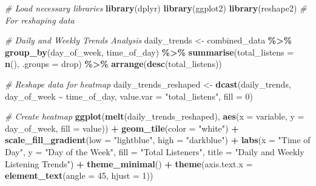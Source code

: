 \documentclass[
]{article}
\newenvironment{Shaded}{\begin{snugshade}}{\end{snugshade}}
\newcommand{\AttributeTok}[1]{\textcolor[rgb]{0.13,0.29,0.53}{#1}}
\newcommand{\CommentTok}[1]{\textcolor[rgb]{0.56,0.35,0.01}{\textit{#1}}}
\newcommand{\DecValTok}[1]{\textcolor[rgb]{0.00,0.00,0.81}{#1}}
\newcommand{\FunctionTok}[1]{\textcolor[rgb]{0.13,0.29,0.53}{\textbf{#1}}}
\newcommand{\NormalTok}[1]{#1}
\newcommand{\OtherTok}[1]{\textcolor[rgb]{0.56,0.35,0.01}{#1}}
\newcommand{\SpecialCharTok}[1]{\textcolor[rgb]{0.81,0.36,0.00}{\textbf{#1}}}
\newcommand{\StringTok}[1]{\textcolor[rgb]{0.31,0.60,0.02}{#1}}
\begin{document}
\begin{Shaded}
\begin{Highlighting}[]
\CommentTok{\# Load necessary libraries}
\FunctionTok{library}\NormalTok{(dplyr)}
\FunctionTok{library}\NormalTok{(ggplot2)}
\FunctionTok{library}\NormalTok{(reshape2) }\CommentTok{\# For reshaping data}

\CommentTok{\# Daily and Weekly Trends Analysis}
\NormalTok{daily\_trends }\OtherTok{\textless{}{-}}\NormalTok{ combined\_data }\SpecialCharTok{\%\textgreater{}\%}
  \FunctionTok{group\_by}\NormalTok{(day\_of\_week, time\_of\_day) }\SpecialCharTok{\%\textgreater{}\%}
  \FunctionTok{summarise}\NormalTok{(}\AttributeTok{total\_listens =} \FunctionTok{n}\NormalTok{(), }\AttributeTok{.groups =} \StringTok{\textquotesingle{}drop\textquotesingle{}}\NormalTok{) }\SpecialCharTok{\%\textgreater{}\%}
  \FunctionTok{arrange}\NormalTok{(}\FunctionTok{desc}\NormalTok{(total\_listens))}

\CommentTok{\# Reshape data for heatmap}
\NormalTok{daily\_trends\_reshaped }\OtherTok{\textless{}{-}} \FunctionTok{dcast}\NormalTok{(daily\_trends, day\_of\_week }\SpecialCharTok{\textasciitilde{}}\NormalTok{ time\_of\_day, }\AttributeTok{value.var =} \StringTok{"total\_listens"}\NormalTok{, }\AttributeTok{fill =} \DecValTok{0}\NormalTok{)}

\CommentTok{\# Create heatmap}
\FunctionTok{ggplot}\NormalTok{(}\FunctionTok{melt}\NormalTok{(daily\_trends\_reshaped), }\FunctionTok{aes}\NormalTok{(}\AttributeTok{x =}\NormalTok{ variable, }\AttributeTok{y =}\NormalTok{ day\_of\_week, }\AttributeTok{fill =}\NormalTok{ value)) }\SpecialCharTok{+}
  \FunctionTok{geom\_tile}\NormalTok{(}\AttributeTok{color =} \StringTok{"white"}\NormalTok{) }\SpecialCharTok{+}
  \FunctionTok{scale\_fill\_gradient}\NormalTok{(}\AttributeTok{low =} \StringTok{"lightblue"}\NormalTok{, }\AttributeTok{high =} \StringTok{"darkblue"}\NormalTok{) }\SpecialCharTok{+}
  \FunctionTok{labs}\NormalTok{(}\AttributeTok{x =} \StringTok{"Time of Day"}\NormalTok{, }\AttributeTok{y =} \StringTok{"Day of the Week"}\NormalTok{, }\AttributeTok{fill =} \StringTok{"Total Listeners"}\NormalTok{, }
       \AttributeTok{title =} \StringTok{"Daily and Weekly Listening Trends"}\NormalTok{) }\SpecialCharTok{+}
  \FunctionTok{theme\_minimal}\NormalTok{() }\SpecialCharTok{+}
  \FunctionTok{theme}\NormalTok{(}\AttributeTok{axis.text.x =} \FunctionTok{element\_text}\NormalTok{(}\AttributeTok{angle =} \DecValTok{45}\NormalTok{, }\AttributeTok{hjust =} \DecValTok{1}\NormalTok{))}
\end{Highlighting}
\end{Shaded}
\end{document}
